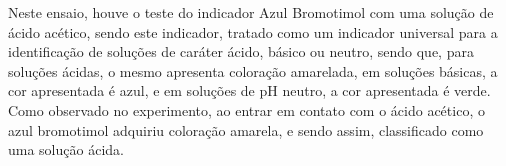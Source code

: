 \begin{figure}[h]
            \label{fig:experimento16}
        \end{figure}
    
    	\indent Neste ensaio, houve o teste do indicador Azul Bromotimol com uma solução de ácido acético, sendo este indicador, tratado como um indicador universal para a identificação de soluções de caráter ácido, básico ou neutro, sendo que, para soluções ácidas, o mesmo apresenta coloração amarelada, em soluções básicas, a cor apresentada é azul, e em soluções de pH neutro, a cor apresentada é verde.\\
    	
    	\indent Como observado no experimento, ao entrar em contato com o ácido acético, o azul bromotimol adquiriu coloração amarela, e sendo assim, classificado como uma solução ácida.

